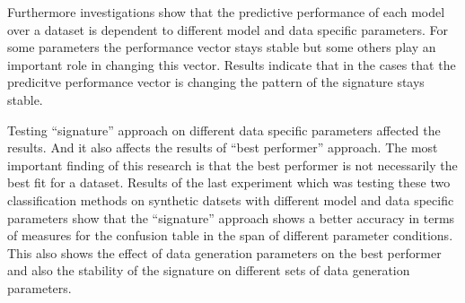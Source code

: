 Furthermore investigations show that the predictive performance of each model over a dataset is dependent to different model and data specific parameters. For some parameters the performance vector stays stable but some others play an important role in changing this vector. Results indicate that in the cases that the predicitve performance vector is changing the pattern of the signature stays stable. 



Testing ``signature'' approach on different data specific parameters affected the results. And it also affects the results of ``best performer'' approach. The most important finding of this research is that the best performer is not necessarily the best fit for a dataset. Results of the last experiment which was testing these two classification methods on synthetic datsets with different model and data specific parameters show that the ``signature'' approach shows a better accuracy in terms of measures for the confusion table in the span of different parameter conditions. This also shows the effect of data generation parameters on the best performer and also the stability of the signature on different sets of data generation parameters.

